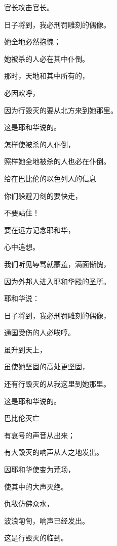 {\par }{\Q 官长攻击官长。
\par }{\BB \par }{\Q {}日子将到，我必刑罚{}雕刻的偶像。
\par }{\Q 她全地必然抱愧；
\par }{\Q 她被杀的人必在其中仆倒。
\par }{\Q {}那时，天地和其中所有的，
\par }{\Q 必因{}欢呼，
\par }{\Q 因为行毁灭的要从北方来到她那里。
\par }{\Q 这是耶和华说的。
\par }{\Q {}怎样使{}被杀的人仆倒，
\par }{\Q 照样她全地被杀的人也必在{}仆倒。
\par }{\SH 给在巴比伦的以色列人的信息
\par }{\Q {}你们躲避刀剑的要快走，
\par }{\Q 不要站住！
\par }{\Q 要在远方记念耶和华，
\par }{\Q 心中追想{}。
\par }{\Q {}我们听见辱骂就蒙羞，满面惭愧，
\par }{\Q 因为外邦人进入耶和华殿的圣所。
\par }{\BB \par }{\Q {}耶和华说：
\par }{\Q 日子将到，我必刑罚{}雕刻的偶像，
\par }{\Q 通国受伤的人必唉哼。
\par }{\Q {}虽升到天上，
\par }{\Q 虽使她坚固的高处更坚固，
\par }{\Q 还有行毁灭的从我这里到她那里。
\par }{\Q 这是耶和华说的。
\par }{\SH 巴比伦灭亡
\par }{\Q {}有哀号的声音从{}出来；
\par }{\Q 有大毁灭的响声从{}人之地发出。
\par }{\Q {}因耶和华使{}变为荒场，
\par }{\Q 使其中的大声灭绝。
\par }{\Q 仇敌仿佛众水，
\par }{\Q 波浪匉訇，响声已经发出。
\par }{\Q {}这是行毁灭的临到{}。
}
